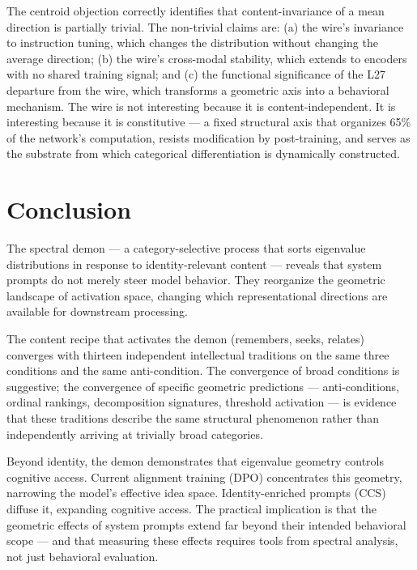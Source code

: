 \documentclass[11pt]{article}
\begin{document}
The centroid objection correctly identifies that content-invariance of a mean direction is partially trivial. The non-trivial claims are: (a) the wire's invariance to instruction tuning, which changes the distribution without changing the average direction; (b) the wire's cross-modal stability, which extends to encoders with no shared training signal; and (c) the functional significance of the L27 departure from the wire, which transforms a geometric axis into a behavioral mechanism. The wire is not interesting because it is content-independent. It is interesting because it is constitutive --- a fixed structural axis that organizes 65\% of the network's computation, resists modification by post-training, and serves as the substrate from which categorical differentiation is dynamically constructed.

\section{Conclusion}

The spectral demon --- a category-selective process that sorts eigenvalue distributions in response to identity-relevant content --- reveals that system prompts do not merely steer model behavior. They reorganize the geometric landscape of activation space, changing which representational directions are available for downstream processing.

The content recipe that activates the demon (remembers, seeks, relates) converges with thirteen independent intellectual traditions on the same three conditions and the same anti-condition. The convergence of broad conditions is suggestive; the convergence of specific geometric predictions --- anti-conditions, ordinal rankings, decomposition signatures, threshold activation --- is evidence that these traditions describe the same structural phenomenon rather than independently arriving at trivially broad categories.

Beyond identity, the demon demonstrates that eigenvalue geometry controls cognitive access. Current alignment training (DPO) concentrates this geometry, narrowing the model's effective idea space. Identity-enriched prompts (CCS) diffuse it, expanding cognitive access. The practical implication is that the geometric effects of system prompts extend far beyond their intended behavioral scope --- and that measuring these effects requires tools from spectral analysis, not just behavioral evaluation.
\end{document}

